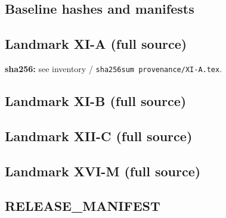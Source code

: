 \documentclass{article}
\theoremstyle{remark}
\begin{document}
\subsection{Baseline hashes and manifests}





\subsection{Landmark XI-A (full source)}
\label{app:XIA}
\textbf{sha256:} see inventory / \texttt{sha256sum provenance/XI-A.tex}.


\subsection{Landmark XI-B (full source)}
\label{app:XIB}


\subsection{Landmark XII-C (full source)}
\label{app:XIIC}


\subsection{Landmark XVI-M (full source)}
\label{app:XVIM}


\subsection{RELEASE\_MANIFEST}
\label{app:manifest}

\end{document}
